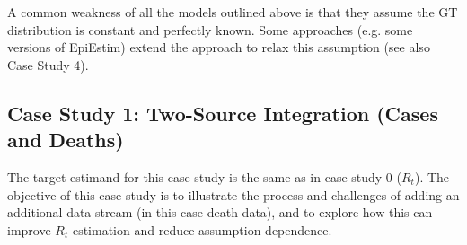 \documentclass{article}
\begin{document}
A common weakness of all the models outlined above is that they assume the GT distribution is constant and perfectly known. Some approaches (e.g. some versions of EpiEstim) extend the approach to relax this assumption (see also Case Study 4).
 



\subsection{Case Study 1: Two-Source Integration (Cases and Deaths)}

The target estimand for this case study is the same as in case study 0 ($R_t$). The objective of this case study is to illustrate the process and challenges of adding an additional data stream (in this case death data), and to explore how this can improve $R_t$ estimation and reduce assumption dependence.
\end{document}
